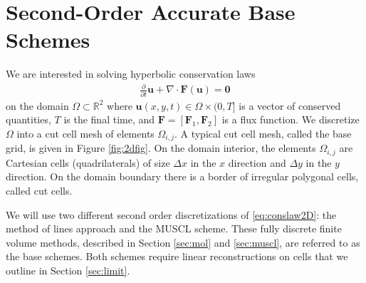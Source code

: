 \section{Second-Order Accurate Base Schemes}\label{sec:basefv}
We are interested in solving hyperbolic conservation laws 
\begin{equation}
\begin{aligned} \label{eq:conslaw2D}
\frac{\partial}{\partial t}	\mathbf{u} + \nabla \cdot \mathbf{F}(\mathbf{u}) = \mathbf{0}
\end{aligned}
\end{equation}
on the domain $\Omega \subset \mathbb{R}^2$ where $\mathbf{u}(x,y,t) \in \Omega \times (0,T]$ is a vector of conserved quantities, $T$ is the final time, and $\mathbf{F} = [\mathbf{F}_1, \mathbf{F}_2]$ is a flux function.  We discretize $\Omega$ into a cut cell mesh of elements $\Omega_{i,j}$.  A typical cut cell mesh, called the base grid, is given in Figure \ref{fig:2dfig}.  On the domain interior, the elements $\Omega_{i,j}$ are Cartesian cells (quadrilaterals) of size $\Delta x$ in the $x$ direction and $\Delta y$ in the $y$ direction.  On the domain boundary there is a border of irregular polygonal cells, called cut cells.  







We will use two different second order discretizations of \eqref{eq:conslaw2D}: the method of lines approach and the MUSCL scheme.
These fully discrete finite volume methods, described in Section \ref{sec:mol} and \ref{sec:muscl}, are referred to as the base schemes.  Both schemes require linear reconstructions on cells that we outline in Section \ref{sec:limit}.  

